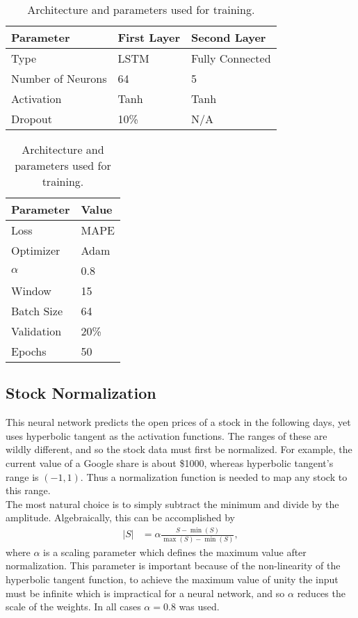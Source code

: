 \documentclass[12pt]{article}
\begin{document}
\begin{table}[htbp]
\begin{subtable}{0.67\textwidth}
\centering
\begin{tabular}{|l | l | l|}
\hline
Parameter & First Layer & Second Layer \\
\hline
Type & LSTM & Fully Connected \\
Number of Neurons & 64 & 5 \\
Activation & Tanh & Tanh \\
Dropout & 10\% & N/A \\
\hline
\end{tabular}
\caption{Architecture of network.}
\end{subtable}
\begin{subtable}{0.33\textwidth}
\centering
\begin{tabular}{|l | l|}
\hline
Parameter & Value \\
\hline
Loss & MAPE \\
Optimizer & Adam \\
$\alpha$ & 0.8 \\
Window & 15 \\
Batch Size & 64 \\
Validation & 20\% \\
Epochs & 50 \\
\hline
\end{tabular}
\caption{Parameters used for training.}
\label{tab:train}
\end{subtable}
\caption{Architecture and parameters used for training.}
\label{tab:param}
\end{table}

\subsection{Stock Normalization}

This neural network predicts the open prices of a stock in the following days, yet uses hyperbolic tangent as the activation functions. The ranges of these are wildly different, and so the stock data must first be normalized. For example, the current value of a Google share is about \$1000, whereas hyperbolic tangent's range is $(-1, 1)$. Thus a normalization function is needed to map any stock to this range. \\

The most natural choice is to simply subtract the minimum and divide by the amplitude. Algebraically, this can be accomplished by
\begin{align*}
|S| &= \alpha \frac{S - \min(S)}{\max(S) - \min(S)},
\end{align*}
where $\alpha$ is a scaling parameter which defines the maximum value after normalization. This parameter is important because of the non-linearity of the hyperbolic tangent function, to achieve the maximum value of unity the input must be infinite which is impractical for a neural network, and so $\alpha$ reduces the scale of the weights. In all cases $\alpha = 0.8$ was used. \\
\end{document}
